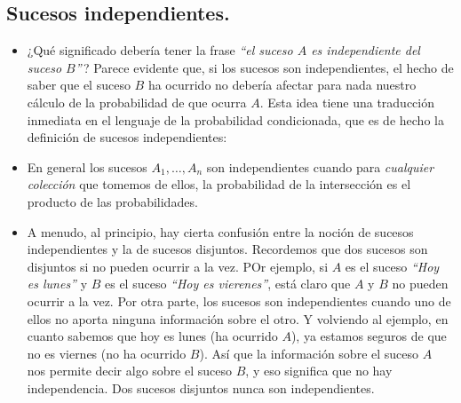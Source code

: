 \subsection{Sucesos independientes.}

\begin{itemize}

    \item ¿Qué significado debería tener la frase {\em ``el suceso $A$ es independiente del suceso $B$''}\,? Parece evidente que, si los sucesos son independientes, el hecho de saber que el suceso $B$ ha ocurrido no debería afectar para nada nuestro cálculo de la probabilidad de que ocurra $A$. Esta idea tiene una traducción inmediata en el lenguaje de la probabilidad condicionada, que es de hecho la definición de sucesos independientes:
        \vspace{-3mm}
        \begin{center}
        \end{center}

    \item En general los sucesos $A_1,\ldots,A_n$ son independientes cuando para {\em cualquier colección} que tomemos de ellos, la probabilidad de la intersección es el producto de las probabilidades.
    
    \item A menudo, al principio, hay cierta confusión entre la noción de sucesos independientes y la de sucesos disjuntos. Recordemos que dos sucesos son disjuntos si no pueden ocurrir a la vez. POr ejemplo, si $A$ es el suceso {\em ``Hoy es lunes''} y $B$ es el suceso {\em ``Hoy es vierenes''}, está claro que $A$ y $B$ no pueden ocurrir a la vez. Por otra parte, los sucesos son independientes cuando uno de ellos no aporta ninguna información sobre el otro. Y volviendo al ejemplo, en cuanto sabemos que hoy es lunes (ha ocurrido $A$), ya estamos seguros de que no es viernes (no ha ocurrido $B$). Así que la información sobre el suceso $A$ nos permite decir algo sobre el suceso $B$, y eso significa que no hay independencia. {\sf Dos sucesos disjuntos nunca son independientes}.

\end{itemize}


